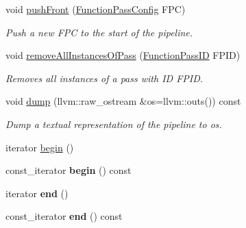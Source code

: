 \begin{DoxyCompactItemize}
\mbox{\label{classglow_1_1_function_pass_pipeline_a216864da6e220eeb694ef3f2a01cd1e0}} 
void \hyperlink{classglow_1_1_function_pass_pipeline_a216864da6e220eeb694ef3f2a01cd1e0}{push\+Front} (\hyperlink{classglow_1_1_function_pass_config}{Function\+Pass\+Config} F\+PC)
\begin{DoxyCompactList}\small\item\em Push a new {\ttfamily F\+PC} to the start of the pipeline. \end{DoxyCompactList}\item 
\mbox{\label{classglow_1_1_function_pass_pipeline_a28cce56dc5a9581c3b2a748374b7680d}} 
void \hyperlink{classglow_1_1_function_pass_pipeline_a28cce56dc5a9581c3b2a748374b7680d}{remove\+All\+Instances\+Of\+Pass} (\hyperlink{namespaceglow_a3157945b92abd634c79fa9d4724472eb}{Function\+Pass\+ID} F\+P\+ID)
\begin{DoxyCompactList}\small\item\em Removes all instances of a pass with ID {\ttfamily F\+P\+ID}. \end{DoxyCompactList}\item 
\mbox{\label{classglow_1_1_function_pass_pipeline_aed5d754238d8d6b4981c2ab5a29e5a00}} 
void \hyperlink{classglow_1_1_function_pass_pipeline_aed5d754238d8d6b4981c2ab5a29e5a00}{dump} (llvm\+::raw\+\_\+ostream \&os=llvm\+::outs()) const
\begin{DoxyCompactList}\small\item\em Dump a textual representation of the pipeline to {\ttfamily os}. \end{DoxyCompactList}\end{DoxyCompactItemize}
\textbf{ }\par
\begin{DoxyCompactItemize}
\item 
iterator \hyperlink{classglow_1_1_function_pass_pipeline_a83ba1e6d68321e940295252d4e646b2e}{begin} ()
\item 
\mbox{\label{classglow_1_1_function_pass_pipeline_a55a882951cea5d4ff51d6ab5951ddcb1}} 
const\+\_\+iterator {\bfseries begin} () const
\item 
\mbox{\label{classglow_1_1_function_pass_pipeline_a8be0b2c869719fac390e1bf6ae954c63}} 
iterator {\bfseries end} ()
\item 
\mbox{\label{classglow_1_1_function_pass_pipeline_a96c8f87f940bfbb247edb4c2e05a08b1}} 
const\+\_\+iterator {\bfseries end} () const
\end{DoxyCompactItemize}



